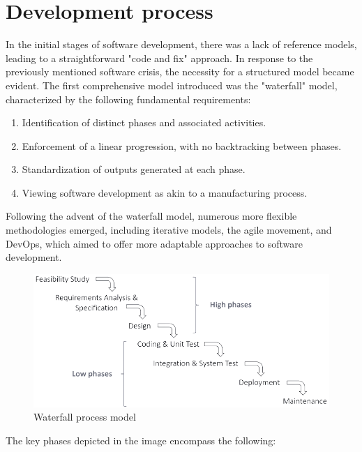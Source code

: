 \documentclass[12pt, a4paper]{report}
\begin{document}
    \section{Development process}
    In the initial stages of software development, there was a lack of reference models, leading to a straightforward "code and fix" approach. 
    In response to the previously mentioned software crisis, the necessity for a structured model became evident.
    The first comprehensive model introduced was the "waterfall" model, characterized by the following fundamental requirements:
    \begin{enumerate}
        \item Identification of distinct phases and associated activities.
        \item Enforcement of a linear progression, with no backtracking between phases.
        \item Standardization of outputs generated at each phase.
        \item Viewing software development as akin to a manufacturing process.
    \end{enumerate}
    Following the advent of the waterfall model, numerous more flexible methodologies emerged, including iterative models, the agile movement, and DevOps, which aimed to offer more adaptable approaches to software development.
    \begin{figure}[H]
        \centering
        \includegraphics[width=0.75\linewidth]{images/waterfall.png}
        \caption{Waterfall process model}
    \end{figure}
    The key phases depicted in the image encompass the following:
\end{document}
